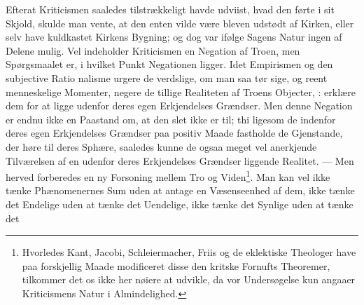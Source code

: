 \documentclass[12pt]{book}
\newcommand{\dsi}{\reflectbox{c}:}
\newcommand{\opage}[1]{\marginnote{\footnotesize\textit{[#1]}}}
\begin{document}
Efterat Kriticismen saaledes tilstrækkeligt havde udviist, hvad den førte i sit
Skjold, skulde man vente, at den enten vilde være bleven udstødt af Kirken,
eller selv have kuldkastet Kirkens Bygning; og dog var ifølge Sagens Natur ingen
af Delene mulig. Vel indeholder Kriticismen en Negation af Troen, men
Spørgsmaalet er, i hvilket Punkt Negationen ligger. Idet Empirismen og den
subjective Ratio\-%
\opage{97}\setcounter{footnote}{0}%
nalisme urgere de verdslige, om man saa tør sige, og reent
menneskelige Momenter, negere de tillige Realiteten af Troens Objecter,
\dsi{} erklære dem for at ligge udenfor deres egen Erkjendelses Grændser. Men
denne Negation er endnu ikke en Paastand om, at den slet ikke er til; thi
ligesom de indenfor deres egen Erkjendelses Grændser paa positiv Maade
fastholde de Gjenstande, der høre til deres Sphære, saaledes kunne de ogsaa
meget vel anerkjende Tilværelsen af en udenfor deres Erkjendelses Grændser
liggende Realitet. --- Men herved forberedes en ny Forsoning mellem Tro og
Viden\footnote{Hvorledes Kant, Jacobi, Schleiermacher, Friis og de eklektiske
Theologer have paa forskjellig Maade modificeret disse den kritske Fornufts
Theoremer, tilkommer det os ikke her nøiere at udvikle, da vor Undersøgelse
kun angaaer Kriticismens Natur i Almindelighed.}. Man kan vel ikke tænke
Phænomenernes Sum uden at antage en Væsenseenhed af dem, ikke tænke det
Endelige uden at tænke det Uendelige, ikke tænke det Synlige uden at tænke det
\end{document}
